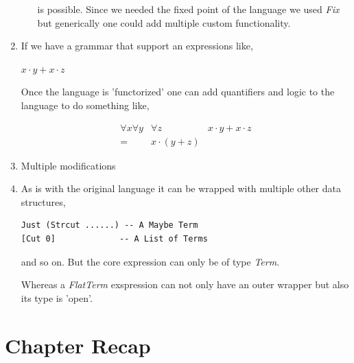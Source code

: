\documentclass[thesis-solanki.tex]{subfiles}
\begin{document}
\begin{enumerate}
\begin{enumerate}
is possible. Since we needed the fixed point of the language we used \textit{Fix} but generically one could add multiple custom 
functionality.  

\end{enumerate}  


\item If we have a grammar that support an expressions like,


\begin{math}
x \cdot y + x \cdot z
\end{math} 

Once the language is 'functorized' one can add quantifiers and logic to the language to do something like,


\begin{align}
  \forall x \forall y & \forall z & x \cdot y + x \cdot z \\
  = & x \cdot (y + z)	
\end{align}

\item Multiple modifications

\item As is with the original language it can be wrapped with multiple other data structures,

\begin{verbatim}
Just (Strcut ......) -- A Maybe Term
[Cut 0]				-- A List of Terms
\end{verbatim} 
and so on. But the core expression can only be of type \textit{Term}. 

Whereas a \textit{FlatTerm} exspression can not only have an outer wrapper but also its type is 'open'.   



\end{enumerate}



\section{Chapter Recap}
\end{document}
